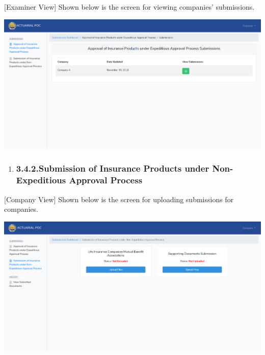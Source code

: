 \documentclass{article}
\begin{document}
[Examiner View] Shown below is the screen for viewing
companies’ submissions.%

\includegraphics[keepaspectratio=true]{up-ic-screens/image6}{}%

\begin{enumerate}[noitemsep,topsep=\mdcompacttopsep]%

\item{}
\subsubsection{3.4.2.\hspace*{0.5em}Submission of Insurance Products under Non-Expeditious Approval Process}\label{sec-submission-of-insurance-products-under-non-expeditious-approval-process}%
\end{enumerate}%

\noindent{}[Company View] Shown below is the screen for
uploading submissions for companies.%

\includegraphics[keepaspectratio=true]{up-ic-screens/image69}{}%
\end{document}
